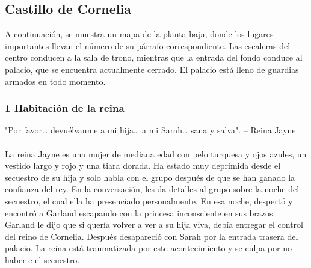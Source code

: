 \subsection*{Castillo de Cornelia}
A continuación, se muestra un mapa de la planta baja, donde los lugares importantes llevan el número de su párrafo correspondiente. Las escaleras del centro conducen a la sala de trono, mientras que la entrada del fondo conduce al palacio, que se encuentra actualmente cerrado. El palacio está lleno de guardias armados en todo momento.
\begin{center} 
\end{center}
\subsubsection*{1 Habitación de la reina}
"Por favor… devuélvanme a mi hija… a mi Sarah… sana y salva".
\indent -- Reina Jayne \\\\
La reina Jayne es una mujer de mediana edad con pelo turquesa y ojos azules, un vestido largo y rojo y una tiara dorada. Ha estado muy deprimida desde el secuestro de su hija y solo habla con el grupo después de que se han ganado la confianza del rey. En la conversación, les da detalles al grupo sobre la noche del secuestro, el cual ella ha presenciado personalmente. En esa noche, despertó y encontró a Garland escapando con la princesa inconsciente en sus brazos. Garland le dijo que si quería volver a ver a su hija viva, debía entregar el control del reino de Cornelia. Después desapareció con Sarah por la entrada trasera del palacio. La reina está traumatizada por este acontecimiento y se culpa por no haber e el secuestro. 

